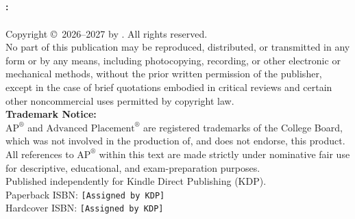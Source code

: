 ﻿%

\thispagestyle{empty}
\begin{center}
  \vspace*{2cm}
  {\Huge\bfseries\color{MidnightBlue} \BookTitle}\\[12pt]
  {\Large\color{DarkSlateGray} \BookSubtitle}\\[24pt]
  {\large\bfseries \BookSeries}\\[36pt]
  {\Large \BookAuthor}\\[24pt]
  {\normalsize \Edition}
\end{center}
\clearpage

\thispagestyle{empty}
\vspace*{\fill}
\begin{center}
  \begin{minipage}{0.9\linewidth}
    \small
    \textbf{\BookTitle: \BookSubtitle}\\
    \BookSeries\\[6pt]
    Copyright \copyright\ 2026--2027 by \BookAuthor. All rights reserved.\\[10pt]
    No part of this publication may be reproduced, distributed, or transmitted in any form or by any means, including photocopying, recording, or other electronic or mechanical methods, without the prior written permission of the publisher, except in the case of brief quotations embodied in critical reviews and certain other noncommercial uses permitted by copyright law.\\[10pt]
    \textbf{Trademark Notice:}\\
    $\text{AP}^\circledR$ and $\text{Advanced Placement}^\circledR$ are registered trademarks of the College Board, which was not involved in the production of, and does not endorse, this product. All references to $\text{AP}^\circledR$ within this text are made strictly under nominative fair use for descriptive, educational, and exam-preparation purposes.\\[10pt]
    Published independently for Kindle Direct Publishing (KDP).\\
    Paperback ISBN: \texttt{[Assigned by KDP]}\\
    Hardcover ISBN: \texttt{[Assigned by KDP]}\\
  \end{minipage}
\end{center}
\vspace*{\fill}
\clearpage

